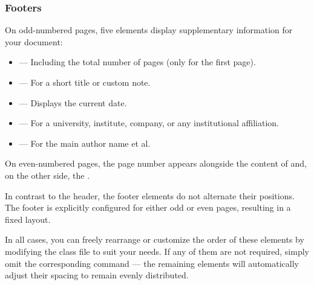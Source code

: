         \subsubsection{Footers}

            On odd-numbered pages, five elements display supplementary information for your document:
    
            \begin{itemize}
                \item \inlinecode{\thepage} — Including the total number of pages (only for the first page).
                \item \inlinecode{\footinfo{}} — For a short title or custom note.
                \item \inlinecode{\theday{}} — Displays the current date.
                \item \inlinecode{\organization{}} — For a university, institute, company, or any institutional affiliation.
                \item \inlinecode{\leadauthor{}} — For the main author name et al.
            \end{itemize}

            On even-numbered pages, the page number appears alongside the content of \inlinecode{\footinfo{}} and, on the other side, the \inlinecode{\leadauthor{}}. 

            In contrast to the header, the footer elements do not alternate their positions. The footer is explicitly configured for either odd or even pages, resulting in a fixed layout.
            
            In all cases, you can freely rearrange or customize the order of these elements by modifying the class file to suit your needs. If any of them are not required, simply omit the corresponding command — the remaining elements will automatically adjust their spacing to remain evenly distributed.

